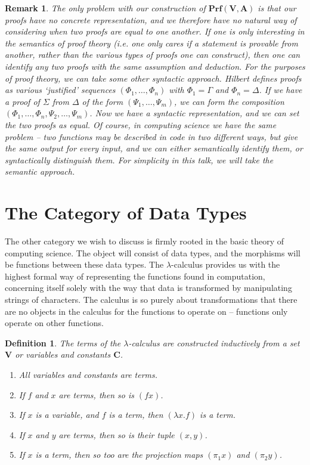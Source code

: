 \documentclass{article}
\theoremstyle{plain}
\newtheorem{definition}{Definition}
\newtheorem*{remark}{Remark}
\begin{document}
\begin{remark}
    The only problem with our construction of $\mathbf{Prf}(\mathbf{V},\mathbf{A})$ is that our proofs have no concrete representation, and we therefore have no natural way of considering when two proofs are equal to one another. If one is only interesting in the semantics of proof theory (i.e. one only cares {\it if} a statement is provable from another, rather than the various types of proofs one can construct), then one can identify any two proofs with the same assumption and deduction. For the purposes of proof theory, we can take some other syntactic approach. Hilbert defines proofs as various `justified' sequences $(\Phi_1, \dots, \Phi_n)$ with $\Phi_1 = \Gamma$ and $\Phi_n = \Delta$. If we have a proof of $\Sigma$ from $\Delta$ of the form $(\Psi_1, \dots, \Psi_m)$, we can form the composition $(\Phi_1, \dots, \Phi_n, \Psi_2, \dots, \Psi_m)$. Now we have a syntactic representation, and we can set the two proofs as equal. Of course, in computing science we have the same problem -- two functions may be described in code in two different ways, but give the same output for every input, and we can either {\it semantically} identify them, or syntactically distinguish them. For simplicity in this talk, we will take the semantic approach.
\end{remark}

\section{The Category of Data Types}

The other category we wish to discuss is firmly rooted in the basic theory of computing science. The object will consist of data types, and the morphisms will be functions between these data types. The $\lambda$-calculus provides us with the highest formal way of representing the functions found in computation, concerning itself solely with the way that data is transformed by manipulating strings of characters. The calculus is so purely about transformations that there are no objects in the calculus for the functions to operate on -- functions only operate on other functions.

\begin{definition}
    The terms of the $\lambda$-calculus are constructed inductively from a set $\mathbf{V}$ or variables and constants $\mathbf{C}$.
    \begin{enumerate}
        \item All variables and constants are terms.
        \item If $f$ and $x$ are terms, then so is $(fx)$.
        \item If $x$ is a variable, and $f$ is a term, then $(\lambda x.f)$ is a term.
        \item If $x$ and $y$ are terms, then so is their tuple $(x,y)$.
        \item If $x$ is a term, then so too are the projection maps $(\pi_1 x)$ and $(\pi_2 y)$.
    \end{enumerate}
\end{definition}
\end{document}
